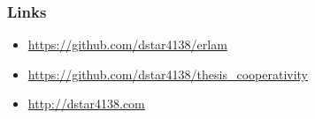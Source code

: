 \begin{frame}
    \frametitle{Links}
    \begin{itemize}
        \item \url{https://github.com/dstar4138/erlam}
        \item \url{https://github.com/dstar4138/thesis_cooperativity}
        \item \url{http://dstar4138.com}
    \end{itemize}
\end{frame}
